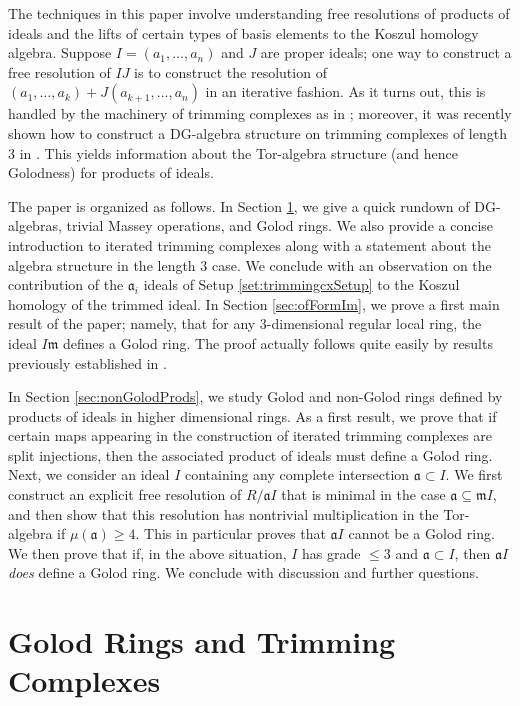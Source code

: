 \documentclass[10pt]{amsart}
\theoremstyle{definition}
\theoremstyle{remark}
\newtheorem{the context}[theorem]{The Context}
\numberwithin{equation}{theorem}
\numberwithin{equation}{section}
\newcommand{\ideal}[1]{\mathfrak{#1}}
\newcommand{\m}{\ideal{m}}
\renewcommand{\geq}{\geqslant}
\renewcommand{\leq}{\leqslant}
\newcommand{\mfa}{\mathfrak{a}}
\begin{document}
The techniques in this paper involve understanding free resolutions of products of ideals and the lifts of certain types of basis elements to the Koszul homology algebra. Suppose $I = (a_1 , \dots , a_n)$ and $J$ are proper ideals; one way to construct a free resolution of $IJ$ is to construct the resolution of $(a_1 , \dots , a_k) + J (a_{k+1} , \dots , a_n)$ in an iterative fashion. As it turns out, this is handled by the machinery of trimming complexes as in \cite{vandebogert2020trimming}; moreover, it was recently shown how to construct a DG-algebra structure on trimming complexes of length $3$ in \cite{vandebogert2020dg}. This yields information about the Tor-algebra structure (and hence Golodness) for products of ideals. 

The paper is organized as follows. In Section \ref{sec:background}, we give a quick rundown of DG-algebras, trivial Massey operations, and Golod rings. We also provide a concise introduction to iterated trimming complexes along with a statement about the algebra structure in the length $3$ case. We conclude with an observation on the contribution of the $\mfa_i$ ideals of Setup \ref{set:trimmingcxSetup} to the Koszul homology of the trimmed ideal. In Section \ref{sec:ofFormIm}, we prove a first main result of the paper; namely, that for any $3$-dimensional regular local ring, the ideal $I \m$ defines a Golod ring. The proof actually follows quite easily by results previously established in \cite{vandebogert2020dg}.

In Section \ref{sec:nonGolodProds}, we study Golod and non-Golod rings defined by products of ideals in higher dimensional rings. As a first result, we prove that if certain maps appearing in the construction of iterated trimming complexes are split injections, then the associated product of ideals must define a Golod ring. Next, we consider an ideal $I$ containing any complete intersection $\mfa \subset I$. We first construct an explicit free resolution of $R / \mfa I$ that is minimal in the case $\mfa \subseteq \m I$, and then show that this resolution has nontrivial multiplication in the Tor-algebra if $\mu (\mfa ) \geq 4$. This in particular proves that $\mfa I$ cannot be a Golod ring. We then prove that if, in the above situation, $I$ has grade $\leq 3$ and $\mfa \subset I$, then $\mfa I$ \emph{does} define a Golod ring. We conclude with discussion and further questions.


\section{Golod Rings and Trimming Complexes}\label{sec:background}
\end{document}

